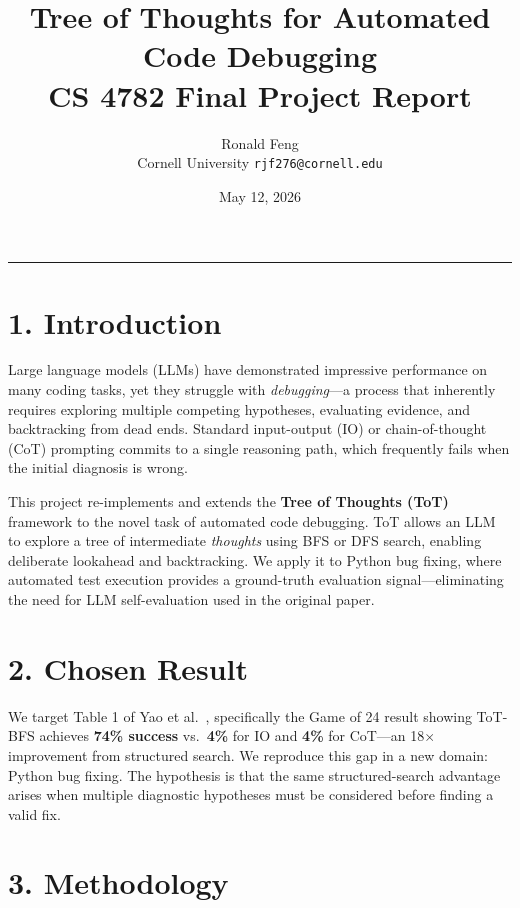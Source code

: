 \documentclass[11pt,letterpaper]{article}
\title{\textbf{Tree of Thoughts for Automated Code Debugging}\\
\large CS 4782 Final Project Report}
\author{Ronald Feng\\
\small Cornell University \quad \texttt{rjf276@cornell.edu}}
\date{May 12, 2026}
\begin{document}
\maketitle
\vspace{-12pt}
\hrule
\vspace{6pt}

\section*{1. Introduction}

Large language models (LLMs) have demonstrated impressive performance on many coding tasks,
yet they struggle with \emph{debugging}—a process that inherently requires exploring multiple
competing hypotheses, evaluating evidence, and backtracking from dead ends.
Standard input-output (IO) or chain-of-thought (CoT) prompting commits to a single reasoning
path, which frequently fails when the initial diagnosis is wrong.

This project re-implements and extends the \textbf{Tree of Thoughts (ToT)} framework
\cite{yao2023tot} to the novel task of automated code debugging.
ToT allows an LLM to explore a tree of intermediate \emph{thoughts} using BFS or DFS search,
enabling deliberate lookahead and backtracking.
We apply it to Python bug fixing, where automated test execution provides a ground-truth
evaluation signal—eliminating the need for LLM self-evaluation used in the original paper.

\section*{2. Chosen Result}

We target Table 1 of Yao et al.\ \cite{yao2023tot}, specifically the Game of 24 result showing
ToT-BFS achieves \textbf{74\% success} vs.\ \textbf{4\%} for IO and \textbf{4\%} for CoT—an
18$\times$ improvement from structured search.
We reproduce this gap in a new domain: Python bug fixing.
The hypothesis is that the same structured-search advantage arises when multiple diagnostic
hypotheses must be considered before finding a valid fix.

\section*{3. Methodology}
\end{document}
